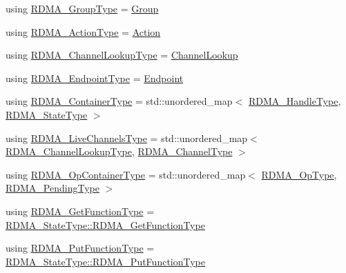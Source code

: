 \begin{DoxyCompactItemize}
using \hyperlink{structvt_1_1rdma_1_1_r_d_m_a_manager_a578dd586d6982be7476b4df7656cd024}{R\+D\+M\+A\+\_\+\+Group\+Type} = \hyperlink{structvt_1_1rdma_1_1_group}{Group}
\item 
using \hyperlink{structvt_1_1rdma_1_1_r_d_m_a_manager_a7b857edc3e489efd9e65e160a4e55a68}{R\+D\+M\+A\+\_\+\+Action\+Type} = \hyperlink{structvt_1_1rdma_1_1_action}{Action}
\item 
using \hyperlink{structvt_1_1rdma_1_1_r_d_m_a_manager_a3df5b264f344d9d4530a96264782a725}{R\+D\+M\+A\+\_\+\+Channel\+Lookup\+Type} = \hyperlink{structvt_1_1rdma_1_1_channel_lookup}{Channel\+Lookup}
\item 
using \hyperlink{structvt_1_1rdma_1_1_r_d_m_a_manager_a106350721a187d2cfb94a9017ef66a07}{R\+D\+M\+A\+\_\+\+Endpoint\+Type} = \hyperlink{structvt_1_1rdma_1_1_endpoint}{Endpoint}
\item 
using \hyperlink{structvt_1_1rdma_1_1_r_d_m_a_manager_a55dd81ff646ebb9d61ebf3a7239ec3b8}{R\+D\+M\+A\+\_\+\+Container\+Type} = std\+::unordered\+\_\+map$<$ \hyperlink{namespacevt_a10442579ec4e7ebef223818e64bcf908}{R\+D\+M\+A\+\_\+\+Handle\+Type}, \hyperlink{structvt_1_1rdma_1_1_r_d_m_a_manager_aad42879902ea82c4de357ad482d9333d}{R\+D\+M\+A\+\_\+\+State\+Type} $>$
\item 
using \hyperlink{structvt_1_1rdma_1_1_r_d_m_a_manager_a689c48ff97319fd83c19e7230b8e9d62}{R\+D\+M\+A\+\_\+\+Live\+Channels\+Type} = std\+::unordered\+\_\+map$<$ \hyperlink{structvt_1_1rdma_1_1_r_d_m_a_manager_a3df5b264f344d9d4530a96264782a725}{R\+D\+M\+A\+\_\+\+Channel\+Lookup\+Type}, \hyperlink{structvt_1_1rdma_1_1_r_d_m_a_manager_ad6a7e417dca07fe5743318e1153677a8}{R\+D\+M\+A\+\_\+\+Channel\+Type} $>$
\item 
using \hyperlink{structvt_1_1rdma_1_1_r_d_m_a_manager_a8c9def755fab6d3eb1f529175243f38a}{R\+D\+M\+A\+\_\+\+Op\+Container\+Type} = std\+::unordered\+\_\+map$<$ \hyperlink{namespacevt_1_1rdma_a9b966d9780a2b41afe7cd7b7b4b20300}{R\+D\+M\+A\+\_\+\+Op\+Type}, \hyperlink{structvt_1_1rdma_1_1_r_d_m_a_manager_a1239149a2070897c56e94e65c2016a7a}{R\+D\+M\+A\+\_\+\+Pending\+Type} $>$
\item 
using \hyperlink{structvt_1_1rdma_1_1_r_d_m_a_manager_a77d00c37a45276b36ef64b9226a8ef0f}{R\+D\+M\+A\+\_\+\+Get\+Function\+Type} = \hyperlink{structvt_1_1rdma_1_1_state_af0baaa6ac5c3b7b256d032f2ee845676}{R\+D\+M\+A\+\_\+\+State\+Type\+::\+R\+D\+M\+A\+\_\+\+Get\+Function\+Type}
\item 
using \hyperlink{structvt_1_1rdma_1_1_r_d_m_a_manager_a714321626dc5613772ac43564c6b7d85}{R\+D\+M\+A\+\_\+\+Put\+Function\+Type} = \hyperlink{structvt_1_1rdma_1_1_state_aa43a5d043fe01086818e9c5c364341d4}{R\+D\+M\+A\+\_\+\+State\+Type\+::\+R\+D\+M\+A\+\_\+\+Put\+Function\+Type}

\end{DoxyCompactItemize}
